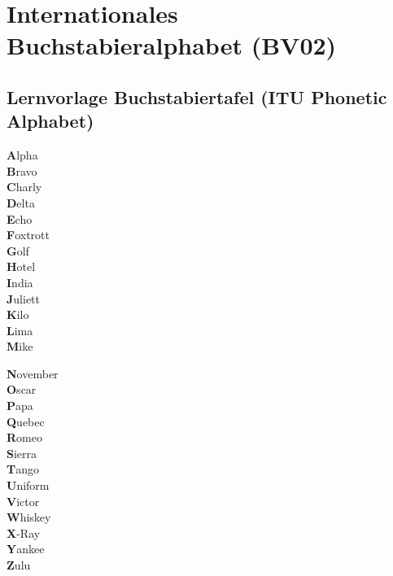 \graphicspath{{bv02_Buchstabieren+Funken/}}


   \chapter{Internationales Buchstabieralphabet (BV02)}


\section{Lernvorlage Buchstabiertafel (ITU Phonetic Alphabet)}

\begin{minipage}[t]{0.5\textwidth}
  \large
  \textbf{A}lpha\\
  \textbf{B}ravo\\
  \textbf{C}harly\\
  \textbf{D}elta\\
  \textbf{E}cho\\
  \textbf{F}oxtrott\\
  \textbf{G}olf\\
  \textbf{H}otel\\
  \textbf{I}ndia\\
  \textbf{J}uliett\\
  \textbf{K}ilo\\
  \textbf{L}ima\\
  \textbf{M}ike\\
\end{minipage}
\begin{minipage}[t]{0.5\textwidth}
  \large
  \textbf{N}ovember\\
  \textbf{O}scar\\
  \textbf{P}apa\\
  \textbf{Q}uebec\\
  \textbf{R}omeo\\
  \textbf{S}ierra\\
  \textbf{T}ango\\
  \textbf{U}niform\\
  \textbf{V}ictor\\
  \textbf{W}hiskey\\
  \textbf{X}-Ray\\
  \textbf{Y}ankee\\
  \textbf{Z}ulu\\
\end{minipage}

